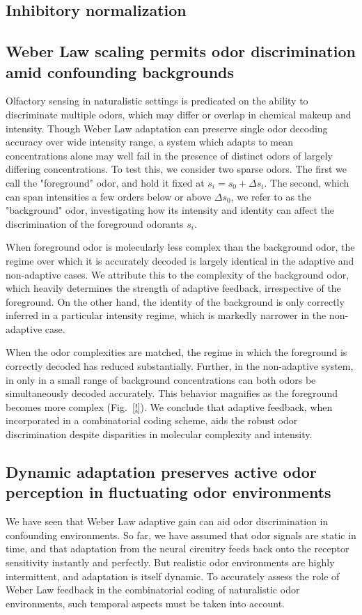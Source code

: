 \subsection*{Inhibitory normalization}

\subsection*{Weber Law scaling permits odor discrimination amid confounding backgrounds}

Olfactory sensing in naturalistic settings is predicated on the ability to discriminate multiple odors, which may differ or overlap in chemical makeup and intensity. Though Weber Law adaptation can preserve single odor decoding accuracy over wide intensity range, a system which adapts to mean concentrations alone may well fail in the presence of distinct odors of largely differing concentrations. To test this, we consider two sparse odors. The first we call the "foreground" odor, and hold it fixed at $s_i = s_0 + \Delta s_i$. The second, which can span intensities a few orders below or above $\Delta s_0$, we refer to as the "background" odor, investigating how its intensity and identity can affect the discrimination of the foreground odorants $s_i$. 

When foreground odor is molecularly less complex than the background odor, the regime over which it is accurately decoded is largely identical in the adaptive and non-adaptive cases. We attribute this to the complexity of the background odor, which heavily determines the strength of adaptive feedback, irrespective of the foreground. On the other hand, the identity of the background is only correctly inferred in a particular intensity regime, which is markedly narrower in the non-adaptive case.

When the odor complexities are matched, the regime in which the foreground is correctly decoded has reduced substantially. Further, in the non-adaptive system, in only in a small range of background concentrations can both odors be simultaneously decoded accurately. This behavior magnifies as the foreground becomes more complex (Fig.~\ref{!}). We conclude that adaptive feedback, when incorporated in a combinatorial coding scheme, aids the robust odor discrimination despite disparities in molecular complexity and intensity. 

\subsection*{Dynamic adaptation preserves active odor perception in fluctuating odor environments}
We have seen that Weber Law adaptive gain can aid odor discrimination in confounding environments. So far, we have assumed that odor signals are static in time, and that adaptation from the neural circuitry feeds back onto the receptor sensitivity instantly and perfectly. But realistic odor environments are highly intermittent, and adaptation is itself dynamic. To accurately assess the role of Weber Law feedback in the combinatorial coding of naturalistic odor environments, such temporal aspects must be taken into account. 

